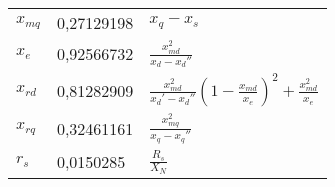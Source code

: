 \begin{longtable}[]{@{}lll@{}}
\begin{minipage}[t]{0.10\columnwidth}\raggedright
\(x_{mq}\)\strut
\end{minipage} & \begin{minipage}[t]{0.25\columnwidth}\raggedright
0,27129198\strut
\end{minipage} & \begin{minipage}[t]{0.55\columnwidth}\raggedright
\(x_q-x_s\)\strut
\end{minipage}\tabularnewline
\begin{minipage}[t]{0.10\columnwidth}\raggedright
\(x_e\)\strut
\end{minipage} & \begin{minipage}[t]{0.25\columnwidth}\raggedright
0,92566732\strut
\end{minipage} & \begin{minipage}[t]{0.55\columnwidth}\raggedright
\(\frac{x_{md}^2}{x_d-x_d''}\)\strut
\end{minipage}\tabularnewline
\begin{minipage}[t]{0.10\columnwidth}\raggedright
\(x_{rd}\)\strut
\end{minipage} & \begin{minipage}[t]{0.25\columnwidth}\raggedright
0,81282909\strut
\end{minipage} & \begin{minipage}[t]{0.55\columnwidth}\raggedright
\(\frac{x_{md}^2}{x_d'-x_d''}(1-\frac{x_{md}}{x_e})^2+\frac{x_{md}^2}{x_e}\)\strut
\end{minipage}\tabularnewline
\begin{minipage}[t]{0.10\columnwidth}\raggedright
\(x_{rq}\)\strut
\end{minipage} & \begin{minipage}[t]{0.25\columnwidth}\raggedright
0,32461161\strut
\end{minipage} & \begin{minipage}[t]{0.55\columnwidth}\raggedright
\(\frac{x_{mq}^2}{x_q-x_q''}\)\strut
\end{minipage}\tabularnewline
\begin{minipage}[t]{0.10\columnwidth}\raggedright
\(r_s\)\strut
\end{minipage} & \begin{minipage}[t]{0.25\columnwidth}\raggedright
0,0150285\strut
\end{minipage} & \begin{minipage}[t]{0.55\columnwidth}\raggedright
\(\frac{R_s}{X_N}\)\strut
\end{minipage}\tabularnewline

\end{longtable}

